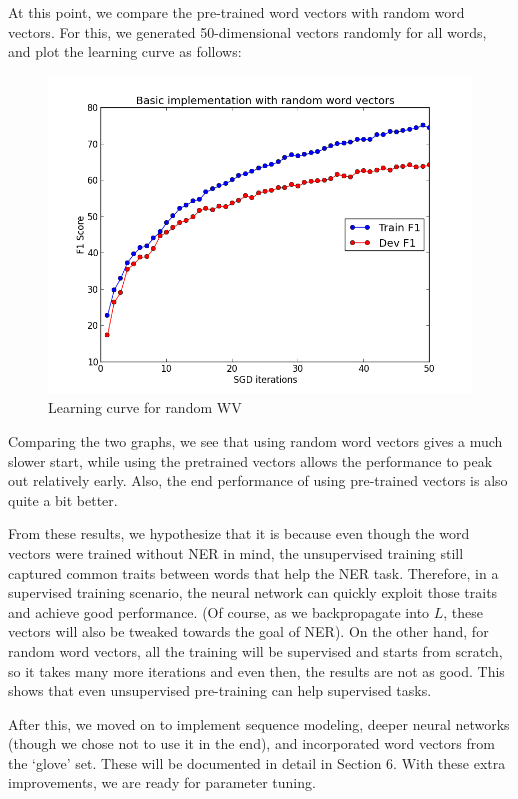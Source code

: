\documentclass[12pt, twocolumn]{article}
\begin{document}
At this point, we compare the pre-trained word vectors with random word vectors. For this, we generated 50-dimensional vectors randomly for all words, and plot the learning curve as follows:
\begin{figure}[H]
\centering
\includegraphics[width = \linewidth]{plots/randomwv}
\caption{Learning curve for random WV}
\label{fig:randomwv}
\end{figure}
Comparing the two graphs, we see that using random word vectors gives a much slower start, while using the pretrained vectors allows the performance to peak out relatively early. Also, the end performance of using pre-trained vectors is also quite a bit better.

From these results, we hypothesize that it is because even though the word vectors were trained without NER in mind, the unsupervised training still captured common traits between words that help the NER task. Therefore, in a supervised training scenario, the neural network can quickly exploit those traits and achieve good performance. (Of course, as we backpropagate into $L$, these vectors will also be tweaked towards the goal of NER). On the other hand, for random word vectors, all the training will be supervised and starts from scratch, so it takes many more iterations and even then, the results are not as good. This shows that even unsupervised pre-training can help supervised tasks.

After this, we moved on to implement sequence modeling, deeper neural networks (though we chose not to use it in the end), and incorporated word vectors from the `glove' set. These will be documented in detail in Section 6. With these extra improvements, we are ready for parameter tuning.
\end{document}
